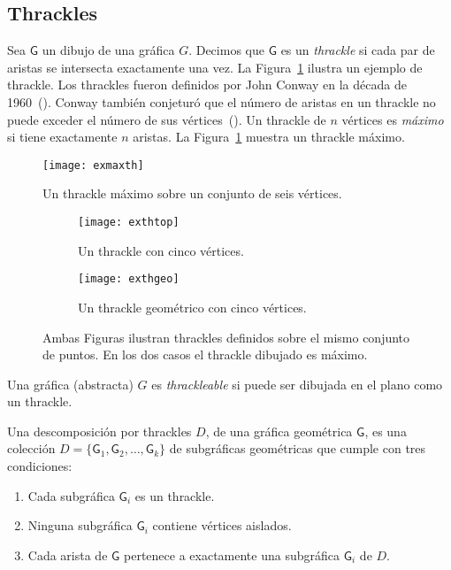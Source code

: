 \subsection{Thrackles} \label{seccion_thrackles}
Sea $\mathsf{G}$ un dibujo de una gráfica $G$. Decimos que $\mathsf{G}$ es un
\emph{thrackle} si cada par de aristas se intersecta exactamente una vez. La
Figura~\ref{fig:exmaxth} ilustra un ejemplo de thrackle.
Los thrackles fueron definidos por John Conway en la década de
1960~(\cite{Pach2013}). Conway también conjeturó que el número de aristas en un
thrackle no puede exceder el número de sus vértices~(\cite{Fulek2011}).
Un thrackle de $n$ vértices es \emph{máximo} si tiene exactamente
$n$ aristas. La Figura~\ref{fig:exmaxth} muestra un thrackle máximo.

\begin{figure}[htpb]
  \centering
  \texttt{[image: exmaxth]}
  \caption{Un thrackle máximo sobre un conjunto de seis vértices.}
  \label{fig:exmaxth}
\end{figure}

\begin{figure}[htb]
  \centering
\begin{subfigure}[h]{.4\textwidth}
  \centering
  \texttt{[image: exthtop]}
  \caption{Un thrackle con cinco vértices.}
  \label{fig:exthtop}
\end{subfigure}\hfill%
\begin{subfigure}[h]{.4\textwidth}
  \centering
  \texttt{[image: exthgeo]}
  \caption{Un thrackle geométrico con cinco vértices.}
  \label{fig:exthgeo}
\end{subfigure}
\caption{Ambas Figuras ilustran thrackles definidos sobre el mismo conjunto de
puntos. En los dos casos el thrackle dibujado es máximo.}
\label{fig:exthgeotop}
\end{figure}

Una gráfica (abstracta) $G$ es \emph{thrackleable} si puede ser dibujada en el plano como un thrackle.

Una descomposición por thrackles $D$, de una gráfica geométrica
$\mathsf{G}$, es una colección $D=\{\mathsf{G}_1,\mathsf{G}_2,\dots,\mathsf{G}_k\}$
de subgráficas geométricas que cumple con tres condiciones:
\begin{enumerate}
  \item Cada subgráfica $\mathsf{G}_i$ es un thrackle.
  \item Ninguna subgráfica $\mathsf{G}_i$ contiene vértices aislados.
  \item Cada arista de $\mathsf{G}$ pertenece a exactamente una subgráfica
  $\mathsf{G}_i$ de $D$.
\end{enumerate}


